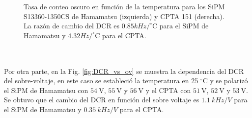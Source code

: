 \begin{figure}[h!]
\begin{subfigure}[b]{0.49\textwidth}
         \caption{}
         \label{fig:DCR_T_CPTA}
     \end{subfigure}
        \caption{Tasa de conteo oscuro en función de la temperatura para los SiPM S13360-1350CS de Hamamatsu (izquierda) y CPTA 151 (derecha). La razón de cambio del DCR es $0.85 kHz/ ^\circ$C para el SiPM de Hamamatsu y  $4.32 Hz/ ^\circ$C para el CPTA.}
        \label{fig:DCR_vs_T}
\end{figure}
\\ \\
Por otra parte, en la Fig. \ref{fig:DCR_vs_ov} se muestra la dependencia del DCR del sobre-voltaje, en este caso se estableció la temperatura en 25  $^\circ$C y se polarizó  el SiPM de Hamamatsu con $54~\mbox{V}$, $55~\mbox{V}$ y $56~\mbox{V}$ y el CPTA con $51~\mbox{V}$, $52~\mbox{V}$ y $53~\mbox{V}$. Se obtuvo que el cambio del DCR en función del sobre voltaje es $1.1~kHz/V$ para el SiPM de Hamamatsu y $0.35~kHz/V$ para el CPTA.
